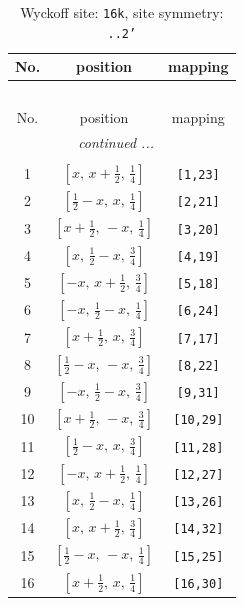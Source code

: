 \documentclass[fleqn,8pt]{jsarticle}
\begin{document}
\begin{longtable}{ccc}
\caption{Wyckoff site: {\tt 16k}, site symmetry: {\tt ..2'}}
 \\
 \hline \hline
No. & position & mapping \\ \hline \endfirsthead

\multicolumn{2}{l}{\tablename\ \thetable{}} \\
 \hline \hline
No. & position & mapping \\ \hline \endhead

 \hline \hline
\multicolumn{2}{r}{\footnotesize\it continued ...} \\ \endfoot

 \hline \hline
\multicolumn{2}{r}{} \\ \endlastfoot

1 & $\left[ x,\, x + \frac{1}{2},\, \frac{1}{4} \right]$ & {\tt [1,23]} \\ \hline
2 & $\left[ \frac{1}{2} - x,\, x,\, \frac{1}{4} \right]$ & {\tt [2,21]} \\ \hline
3 & $\left[ x + \frac{1}{2},\, - x,\, \frac{1}{4} \right]$ & {\tt [3,20]} \\ \hline
4 & $\left[ x,\, \frac{1}{2} - x,\, \frac{3}{4} \right]$ & {\tt [4,19]} \\ \hline
5 & $\left[ - x,\, x + \frac{1}{2},\, \frac{3}{4} \right]$ & {\tt [5,18]} \\ \hline
6 & $\left[ - x,\, \frac{1}{2} - x,\, \frac{1}{4} \right]$ & {\tt [6,24]} \\ \hline
7 & $\left[ x + \frac{1}{2},\, x,\, \frac{3}{4} \right]$ & {\tt [7,17]} \\ \hline
8 & $\left[ \frac{1}{2} - x,\, - x,\, \frac{3}{4} \right]$ & {\tt [8,22]} \\ \hline
9 & $\left[ - x,\, \frac{1}{2} - x,\, \frac{3}{4} \right]$ & {\tt [9,31]} \\ \hline
10 & $\left[ x + \frac{1}{2},\, - x,\, \frac{3}{4} \right]$ & {\tt [10,29]} \\ \hline
11 & $\left[ \frac{1}{2} - x,\, x,\, \frac{3}{4} \right]$ & {\tt [11,28]} \\ \hline
12 & $\left[ - x,\, x + \frac{1}{2},\, \frac{1}{4} \right]$ & {\tt [12,27]} \\ \hline
13 & $\left[ x,\, \frac{1}{2} - x,\, \frac{1}{4} \right]$ & {\tt [13,26]} \\ \hline
14 & $\left[ x,\, x + \frac{1}{2},\, \frac{3}{4} \right]$ & {\tt [14,32]} \\ \hline
15 & $\left[ \frac{1}{2} - x,\, - x,\, \frac{1}{4} \right]$ & {\tt [15,25]} \\ \hline
16 & $\left[ x + \frac{1}{2},\, x,\, \frac{1}{4} \right]$ & {\tt [16,30]} \\
\end{longtable}
\end{document}
